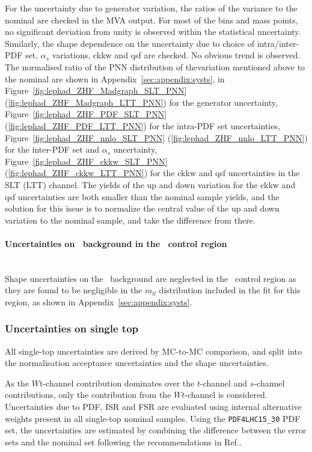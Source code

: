 For the uncertainty due to generator variation, 
the ratios of the variance to the nominal are checked in the MVA output. 
For most of the bins and mass points, no significant deviation from unity is observed
within the statistical uncertainty.
Similarly, the shape dependence on the uncertainty due to choice of intra/inter-PDF set,
$\alpha_s$ variations, ckkw and qsf are checked. 
No obvious trend is observed. The normalised ratio of 
the PNN distribution of thevariation mentioned above to
the nominal are shown in Appendix~\ref{sec:appendix:systs}, 
in Figure~\ref{fig:lephad_ZHF_Madgraph_SLT_PNN} (\ref{fig:lephad_ZHF_Madgraph_LTT_PNN})
for the generator uncertainty, 
Figure~\ref{fig:lephad_ZHF_PDF_SLT_PNN} (\ref{fig:lephad_ZHF_PDF_LTT_PNN})
for the intra-PDF set uncertainties,
Figure~\ref{fig:lephad_ZHF_nnlo_SLT_PNN} (\ref{fig:lephad_ZHF_nnlo_LTT_PNN})
for the inter-PDF set and $\alpha_s$ uncertainty,
Figure~\ref{fig:lephad_ZHF_ckkw_SLT_PNN} (\ref{fig:lephad_ZHF_ckkw_LTT_PNN})
for the ckkw and qsf uncertainties in the SLT (LTT) channel.
The yields of the up and down variation for the ckkw and qsf 
uncertainties are both smaller than the nominal sample yields, 
and the solution for this issue is to normalize 
the central value of the up and down variation to the nominal sample, 
and take the difference from there. 

\paragraph{Uncertainties on \ZHF\ background in the \ZHF\ control region}\mbox{}\\

Shape uncertainties on the \ZHF\ background 
are neglected in the \ZHF\ control region as they are
found to be negligible in the $m_{ll}$ distribution included 
in the fit for this region, as shown in 
Appendix~\ref{sec:appendix:systs}.










\subsubsection{Uncertainties on single top}
\label{sec:DiHiggs:singletopsysts}
All single-top uncertainties are derived by MC-to-MC comparison,  
and split into the normalisation acceptance uncertainties and the 
shape uncertainties.


As the $W$t-channel contribution dominates over the $t$-channel and $s$-channel 
contributions, only the contribution from the $Wt$-channel is considered. 
Uncertainties due to PDF, ISR
and FSR are evaluated using internal alternative
weights present in all single-top nominal samples. 
Using the \texttt{PDF4LHC15\_30} PDF set, 
the uncertainties are estimated by combining the 
difference between the error sets and the nominal 
set following the recommendations in Ref.\cite{Butterworth:2015oua}.

